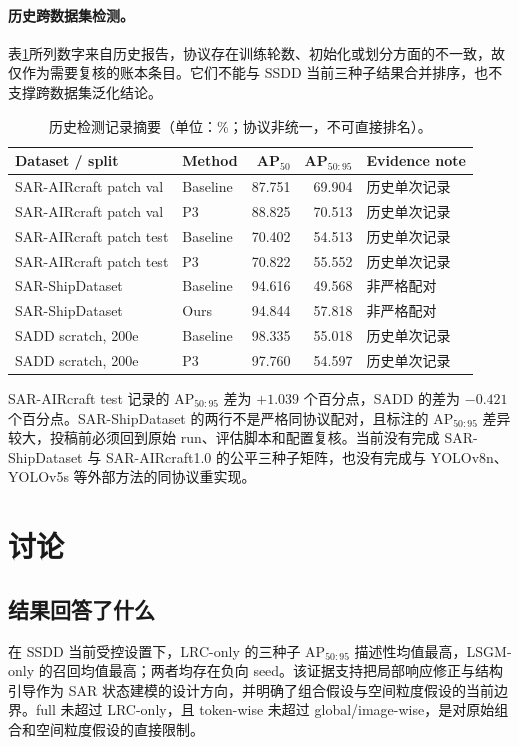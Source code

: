 \documentclass[UTF8,12pt,a4paper]{ctexart}
\begin{document}
\paragraph{历史跨数据集检测。}
表\ref{tab:histdet}所列数字来自历史报告，协议存在训练轮数、初始化或划分方面的不一致，故仅作为需要复核的账本条目。它们不能与 SSDD 当前三种子结果合并排序，也不支撑跨数据集泛化结论。
\begin{table}[H]\centering\small
\caption{历史检测记录摘要（单位：\%；协议非统一，不可直接排名）。}
\label{tab:histdet}
\begin{tabular}{llrrl}
\toprule
Dataset / split & Method & AP$_{50}$ & AP$_{50:95}$ & Evidence note\\
\midrule
SAR-AIRcraft patch val & Baseline & 87.751 & 69.904 & 历史单次记录\\
SAR-AIRcraft patch val & P3 & 88.825 & 70.513 & 历史单次记录\\
SAR-AIRcraft patch test & Baseline & 70.402 & 54.513 & 历史单次记录\\
SAR-AIRcraft patch test & P3 & 70.822 & 55.552 & 历史单次记录\\
SAR-ShipDataset & Baseline & 94.616 & 49.568 & 非严格配对\\
SAR-ShipDataset & Ours & 94.844 & 57.818 & 非严格配对\\
SADD scratch, 200e & Baseline & 98.335 & 55.018 & 历史单次记录\\
SADD scratch, 200e & P3 & 97.760 & 54.597 & 历史单次记录\\
\bottomrule
\end{tabular}
\end{table}
SAR-AIRcraft test 记录的 AP$_{50:95}$ 差为 $+1.039$ 个百分点，SADD 的差为 $-0.421$ 个百分点。SAR-ShipDataset 的两行不是严格同协议配对，且标注的 AP$_{50:95}$ 差异较大，投稿前必须回到原始 run、评估脚本和配置复核。当前没有完成 SAR-ShipDataset 与 SAR-AIRcraft1.0 的公平三种子矩阵，也没有完成与 YOLOv8n、YOLOv5s 等外部方法的同协议重实现。

\section{讨论}
\subsection{结果回答了什么}
在 SSDD 当前受控设置下，LRC-only 的三种子 AP$_{50:95}$ 描述性均值最高，LSGM-only 的召回均值最高；两者均存在负向 seed。该证据支持把局部响应修正与结构引导作为 SAR 状态建模的设计方向，并明确了组合假设与空间粒度假设的当前边界。full 未超过 LRC-only，且 token-wise 未超过 global/image-wise，是对原始组合和空间粒度假设的直接限制。
\end{document}
